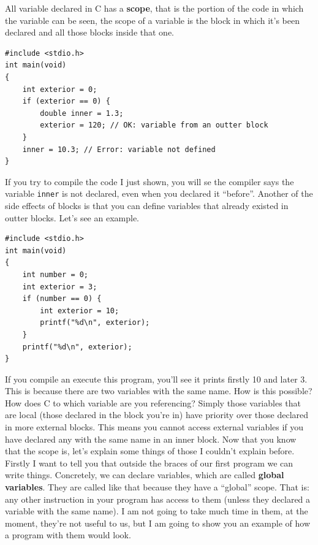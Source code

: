 \documentclass[a4paper]{article}
\begin{document}
All variable declared in C has a \textbf{scope}, that is the portion of the code
in which the variable can be seen, the scope of a variable is the block in which
it's been declared and all those blocks inside that one.

\noindent
\begin{minipage}[H]{\linewidth}
\mbox{}
\begin{lstlisting}[style=C,
caption={Example of scope of declared variables},
label={lst:scopeVar}]
#include <stdio.h>
int main(void)
{
    int exterior = 0;
    if (exterior == 0) {
        double inner = 1.3;
        exterior = 120; // OK: variable from an outter block
    }
    inner = 10.3; // Error: variable not defined
}
\end{lstlisting}
\end{minipage}

If you try to compile the code I just shown, you will se the compiler says the
variable \texttt{inner} is not declared, even when you declared it ``before''.
Another of the side effects of blocks is that you can define variables that
already existed in outter blocks. Let's see an example.

\noindent
\begin{minipage}[H]{\linewidth}
\mbox{}
\begin{lstlisting}[style=C,
caption={Example of redefinition of variable},
label={lst:varRedefinition}]
#include <stdio.h>
int main(void)
{
    int number = 0;
    int exterior = 3;
    if (number == 0) {
        int exterior = 10;
        printf("%d\n", exterior);
    }
    printf("%d\n", exterior);
}
\end{lstlisting}
\end{minipage}

If you compile an execute this program, you'll see it prints firstly 10 and
later 3. This is because there are two variables with the same name. How is this
possible? How does C to which variable are you referencing? Simply those
variables that are local (those declared in the block you're in) have priority
over those declared in more external blocks. This means you cannot access
external variables if you have declared any with the same name in an inner
block.
Now that you know that the scope is, let's explain some things of those I
couldn't explain before. Firstly I want to tell you that outside the braces of
our first program we can write things. Concretely, we can declare variables,
which are called \textbf{global variables}. They are called like that because
they have a ``global'' scope. That is: any other instruction in your program
has access to them (unless they declared a variable with the same name). I am
not going to take much time in them, at the moment, they're not useful to us,
but I am going to show you an example of how a program with them would look.
\end{document}
